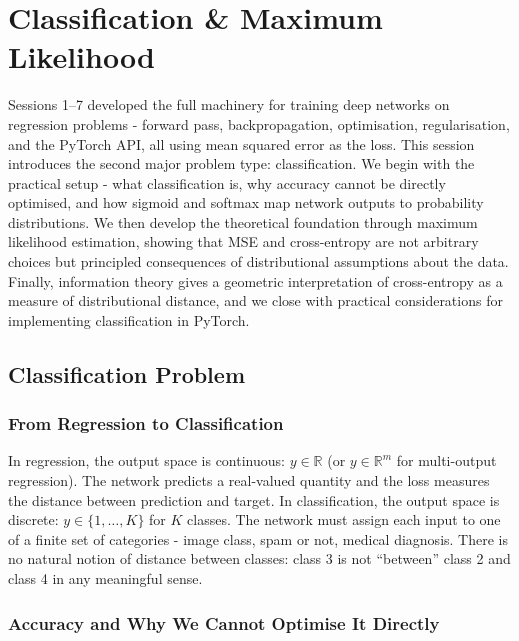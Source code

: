 \section{Classification \& Maximum Likelihood}

Sessions 1--7 developed the full machinery for training deep networks on regression problems - forward pass, backpropagation, optimisation, regularisation, and the PyTorch API, all using mean squared error as the loss. This session introduces the second major problem type: classification. We begin with the practical setup - what classification is, why accuracy cannot be directly optimised, and how sigmoid and softmax map network outputs to probability distributions. We then develop the theoretical foundation through maximum likelihood estimation, showing that MSE and cross-entropy are not arbitrary choices but principled consequences of distributional assumptions about the data. Finally, information theory gives a geometric interpretation of cross-entropy as a measure of distributional distance, and we close with practical considerations for implementing classification in PyTorch.

\subsection{Classification Problem}

\subsubsection{From Regression to Classification}

In regression, the output space is continuous: $y \in \mathbb{R}$ (or $y \in \mathbb{R}^m$ for multi-output regression). The network predicts a real-valued quantity and the loss measures the distance between prediction and target. In classification, the output space is discrete: $y \in \{1, \ldots, K\}$ for $K$ classes. The network must assign each input to one of a finite set of categories - image class, spam or not, medical diagnosis. There is no natural notion of distance between classes: class 3 is not ``between'' class 2 and class 4 in any meaningful sense.


\subsubsection{Accuracy and Why We Cannot Optimise It Directly}

